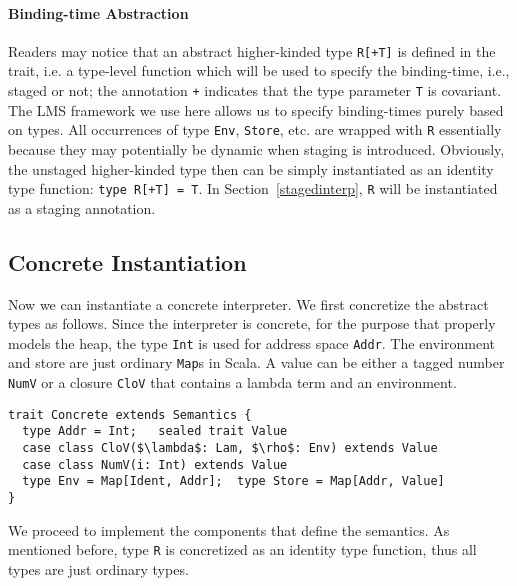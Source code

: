 \paragraph{Binding-time Abstraction}

Readers may notice that an abstract higher-kinded type \texttt{R[+T]} is defined
in the trait, i.e. a type-level function which will be used to specify the
binding-time, i.e., staged or not; the annotation \texttt{+} indicates that the
type parameter \texttt{T} is covariant. The LMS framework we use here allows us
to specify binding-times purely based on types. All occurrences of type
\texttt{Env}, \texttt{Store}, etc. are wrapped with \texttt{R} essentially
because they may potentially be dynamic when staging is introduced. Obviously,
the unstaged higher-kinded type then can be simply instantiated as an identity
type function: \texttt{type R[+T] = T}. In Section~\ref{stagedinterp},
\texttt{R} will be instantiated as a staging annotation.


\subsection{Concrete Instantiation} \label{unstaged_conc}

Now we can instantiate a concrete interpreter. We first concretize the abstract
types as follows. Since the interpreter is concrete, for the purpose that
properly models the heap, the type \texttt{Int} is used for address space
\texttt{Addr}. The environment and store are just ordinary \texttt{Map}s in
Scala. A value can be either a tagged number \texttt{NumV} or a closure
\texttt{CloV} that contains a lambda term and an environment.

\begin{lstlisting}
trait Concrete extends Semantics {
  type Addr = Int;   sealed trait Value
  case class CloV($\lambda$: Lam, $\rho$: Env) extends Value
  case class NumV(i: Int) extends Value
  type Env = Map[Ident, Addr];  type Store = Map[Addr, Value]
}
\end{lstlisting}

We proceed to implement the components that define the semantics. As mentioned
before, type \texttt{R} is concretized as an identity type function, thus all
types are just ordinary types.

